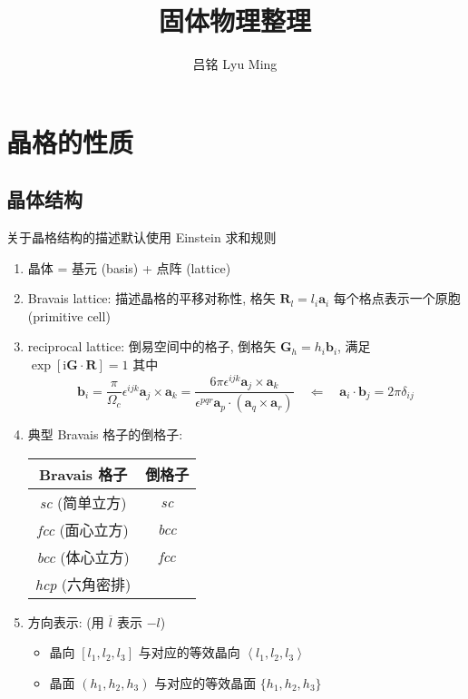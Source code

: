 \documentclass[11pt,a4paper]{article}%
\numberwithin{equation}{section}%
\renewcommand*{\vec}[1]{\bm{#1}}%
\newcommand\mi{\mathrm{i}}
\begin{document}
\title{固体物理整理}
\author{吕铭 Lyu Ming}
\maketitle
\tableofcontents
\section{晶格的性质} %
\label{sec:crystal_lattice}
\subsection{晶体结构} %
关于晶格结构的描述默认使用 Einstein 求和规则
\label{sub:crystal_str}
\begin{enumerate}
	\item 晶体 = 基元 (basis) + 点阵 (lattice)
	\item Bravais lattice: 描述晶格的平移对称性, 格矢 $\vec R_l = l_i\vec a_i$ 每个格点表示一个原胞 (primitive cell)
	\item reciprocal lattice: 倒易空间中的格子, 倒格矢 $\vec G_h = h_i \vec b_i$, 满足 $\exp[\mi\vec G\cdot\vec R] = 1$
	其中
	\begin{equation}
		\vec b_i = \frac{\pi}{\Omega_c}\epsilon^{ijk}\vec a_j\times\vec a_k = \frac{6\pi\epsilon^{ijk}\vec a_j\times\vec a_k}{\epsilon^{pqr}\vec a_p\cdot(\vec a_q\times\vec a_r)}\quad\Leftarrow\quad
		\vec a_i\cdot\vec b_j = 2\pi\delta_{ij} 
	\end{equation}
	\item 典型 Bravais 格子的倒格子: %
	\begin{center}
		\begin{tabular}{cc}
		Bravais 格子 & 倒格子 \\\hline
		\textit{sc} (简单立方)  & \textit{sc} \\
		\textit{fcc} (面心立方) & \textit{bcc} \\
		\textit{bcc} (体心立方) & \textit{fcc} \\
		\textit{hcp} (六角密排) &
		\end{tabular}
	\end{center}
	\item 方向表示: (用 $\overline l$ 表示 $-l$)
	\begin{itemize}
		\item 晶向 $[l_1, l_2, l_3]$ 与对应的等效晶向 $\left\langle l_1,l_2,l_3\right\rangle$
		\item 晶面 $(h_1, h_2, h_3)$ 与对应的等效晶面 $\{h_1,h_2,h_3\}$
	\end{itemize}

\end{enumerate}
\end{document}
